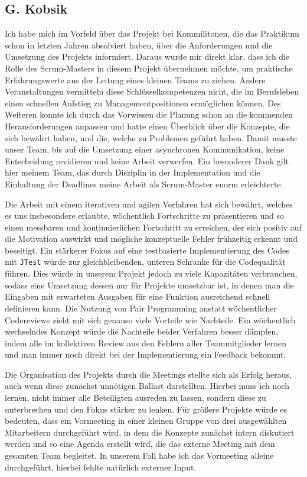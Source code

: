 \documentclass[oneside,abstractoff,a4paper]{scrartcl}
\begin{document}
\subsection{G. Kobsik}

Ich habe mich im Vorfeld über das Projekt bei Kommilitonen, die das Praktikum schon in letzten Jahren absolviert haben, über die Anforderungen und die Umsetzung des Projekts informiert. Daraus wurde mir direkt klar, dass ich die Rolle des Scrum-Masters in diesem Projekt übernehmen möchte, um praktische Erfahrungswerte aus der Leitung eines kleinen Teams zu ziehen. Andere Veranstaltungen vermitteln diese Schlüsselkompetenzen nicht, die im Berufsleben einen schnellen Aufstieg zu Managementpositionen ermöglichen können. 
Des Weiteren konnte ich durch das Vorwissen die Planung schon an die kommenden Herausforderungen anpassen und hatte einen Überblick über die Konzepte, die sich bewährt haben, und die, welche zu Problemen geführt haben. Damit musste unser Team, bis auf die Umsetzung einer asynchronen Kommunikation, keine Entscheidung revidieren und keine Arbeit verwerfen. Ein besonderer Dank gilt hier meinem Team, das durch Disziplin in der Implementation und die Einhaltung der Deadlines meine Arbeit als Scrum-Master enorm erleichterte. 

Die Arbeit mit einem iterativen und agilen Verfahren hat sich bewährt, welches es uns insbesondere erlaubte, wöchentlich Fortschritte zu präsentieren und so einen messbaren und kontinuierlichen Fortschritt zu erreichen, der sich positiv auf die Motivation auswirkt und mögliche konzeptuelle Fehler frühzeitig erkennt und beseitigt. 
Ein stärkerer Fokus auf eine testbasierte Implementierung des Codes mit \texttt{JTest} würde zur gleichbleibenden, unteren Schranke für die Codequalität führen. Dies würde in unserem Projekt jedoch zu viele Kapazitäten verbrauchen, sodass eine Umsetzung dessen nur für Projekte umsetzbar ist, in denen man die Eingaben mit erwarteten Ausgaben für eine Funktion ausreichend schnell definieren kann. Die Nutzung von Pair Programming anstatt wöchentlicher Codereviews zieht mit sich genauso viele Vorteile wie Nachteile. Ein wöchentlich wechselndes Konzept würde die Nachteile beider Verfahren besser dämpfen, indem alle im kollektiven Review aus den Fehlern aller Teammitglieder lernen und man immer noch direkt bei der Implementierung ein Feedback bekommt.

Die Organisation des Projekts durch die Meetings stellte sich als Erfolg heraus, auch wenn diese zunächst unnötigen Ballast darstellten. Hierbei muss ich noch lernen, nicht immer alle Beteiligten ausreden zu lassen, sondern diese zu unterbrechen und den Fokus stärker zu lenken. Für größere Projekte würde es bedeuten, dass ein Vormeeting in einer kleinen Gruppe von drei ausgewählten Mitarbeitern durchgeführt wird, in dem die Konzepte zunächst intern diskutiert werden und so eine Agenda erstellt wird, die das externe Meeting mit dem gesamten Team begleitet. In unserem Fall habe ich das Vormeeting alleine durchgeführt, hierbei fehlte natürlich externer Input.
\end{document}
